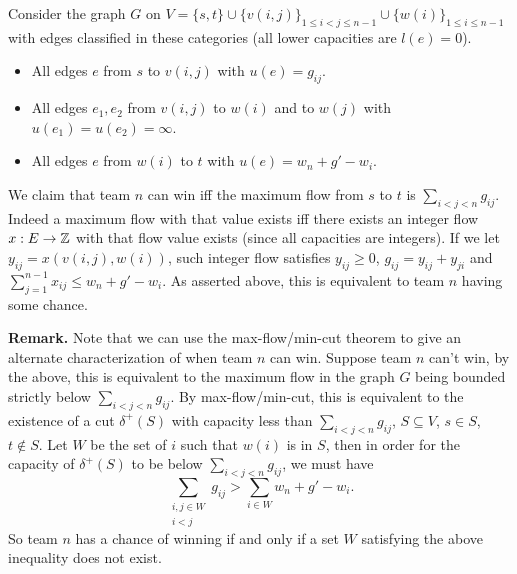 \documentclass[12pt]{article}
\begin{document}
\begin{enumerate}
Consider the graph $G$ on $V = \{s, t\} \cup \{v(i, j)\}_{1 \leq i < j \leq n-1} \cup \{w(i)\}_{1 \leq i \leq n-1}$
with edges classified in these categories (all lower capacities are $l(e) = 0$).

\begin{itemize}
	\item All edges $e$ from $s$ to $v(i, j)$ with $u(e) = g_{ij}$.
	\item All edges $e_1, e_2$ from $v(i, j)$ to $w(i)$ and to $w(j)$ with $u(e_1) = u(e_2) = \infty$.
	\item All edges $e$ from $w(i)$ to $t$ with $u(e) = w_n + g' - w_i$.
\end{itemize}

We claim that team $n$ can win iff the maximum flow from $s$ to $t$ is $\sum_{i<j<n}{g_{ij}}$.
Indeed a maximum flow with that value exists iff there exists an integer flow $x: E \rightarrow {\mathbb Z}$
with that flow value exists (since all capacities are integers).
If we let $y_{ij} = x(v(i, j), w(i))$, such integer flow satisfies $y_{ij} \geq 0$, $g_{ij} = y_{ij} + y_{ji}$
and $\sum_{j=1}^{n-1}{x_{ij}} \leq w_n + g' - w_i$. As asserted above, this is equivalent to team $n$ having some chance.

{\bf Remark.} Note that we can use the max-flow/min-cut theorem to give an alternate characterization of when team $n$ can win. Suppose team $n$ can't win, by the above, this is equivalent to the maximum flow in the graph $G$ being bounded strictly below $\sum_{i<j<n}{g_{ij}}$. By max-flow/min-cut, this is equivalent to the existence of a cut $\delta^+(S)$ with capacity less than $\sum_{i<j<n}{g_{ij}}$, $S \subseteq V$, $s \in S$, $t \not\in S$. Let $W$ be the set of $i$ such that $w(i)$ is in $S$, then in order for the capacity of $\delta^+(S)$ to be below $\sum_{i<j<n}{g_{ij}}$, we must have
\[
\sum_{\substack{i, j \in W\\ i<j}} g_{ij} > \sum_{i \in W} w_n + g' - w_i.
\]
So team $n$ has a chance of winning if and only if a set $W$ satisfying the above inequality does not exist.



\end{enumerate}
\end{document}
